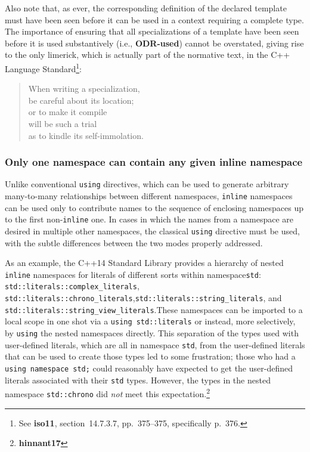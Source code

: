 \noindent Also note that, as ever, the corresponding definition of the declared
template must have been seen before it can be used in a context
requiring a complete type. The importance of ensuring that all
specializations of a template have been seen before it is used
substantively (i.e., \textbf{ODR-used}) cannot be overstated, giving
rise to the only limerick, which is actually part of the normative text,
in the C++ Language Standard{\cprotect\footnote{See \textbf{{iso11}},
  section~14.7.3.7, pp.~375--375, specifically p.~376.}}:
\begin{quote}
When writing a specialization,\\
be careful about its location;\\
or to make it compile\\
will be such a trial\\
as to kindle its self-immolation.
\end{quote}

\subsubsection[Only one namespace can contain any given {\tt inline} namespace]{Only one namespace can contain any given {\SubsubsecCode inline} namespace}\label{only-one-namespace-can-contain-any-given-inline-namespace}

Unlike conventional \texttt{using} directives, which can be used to
generate arbitrary many-to-many relationships between different
namespaces, \texttt{inline} namespaces can be used only to contribute
names to the sequence of enclosing namespaces up to the first
non-\texttt{inline} one. In cases in which the names from a namespace
are desired in multiple other namespaces, the classical \texttt{using}
directive must be used, with the subtle differences between the two
modes properly addressed.

As an example, the C++14 Standard Library provides a hierarchy of nested
\texttt{inline} namespaces for literals of different sorts within
namespace\linebreak[4] \texttt{std}: \texttt{std::literals::complex\_literals},
\texttt{std::literals::chrono\_literals},\linebreak[4]
\texttt{std::literals::string\_literals}, and
\texttt{std::literals::string\_view\_literals}.\linebreak[4]
These namespaces can
be imported to a local scope in one shot via a
\texttt{using}~\texttt{std::literals} or instead, more selectively, by
\texttt{using} the nested namespaces directly. This separation of the
types used with user-defined literals, which are all in namespace
\texttt{std}, from the user-defined literals that can be used to create
those types led to some frustration; those who had a
\texttt{using}~\texttt{namespace}~\texttt{std;} could reasonably have
expected to get the user-defined literals associated with their
\texttt{std} types. However, the types in the nested namespace
\texttt{std::chrono} did \emph{not} meet this
expectation.{\cprotect\footnote{\textbf{hinnant17}}}


